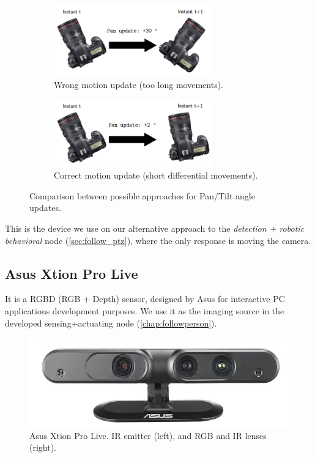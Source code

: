 		\begin{figure}[h]
			\centering
			\begin{subfigure}[h]{0.4\linewidth}
				\centering
				\includegraphics[width=2.7in]{images/ptz_wrong_movement}
				\caption{Wrong motion update (too long movements).}
				\label{fig:3_ptz_wrong}
			\end{subfigure}
			\qquad
			\begin{subfigure}[h]{0.4\linewidth}
				\centering
				\includegraphics[width=2.7in]{images/ptz_correct_movement}
				\caption{Correct motion update (short differential movements).}
				\label{fig:3_ptz_right}
			\end{subfigure}
			\caption{Comparison between possible approaches for Pan/Tilt angle updates.}
			\label{fig:3_ptz_movements}
		\end{figure}
		

		This is the device we use on our alternative approach to the \emph{detection + robotic behavioral} node (\autoref{sec:follow_ptz}), where the only response is moving the camera.\\

	\subsection{Asus Xtion Pro Live}
		\label{sec:3_xtion}
		It is a RGBD (RGB + Depth) sensor, designed by Asus for interactive PC applications development purposes. We use it as the imaging source in the developed sensing+actuating node (\autoref{chap:followperson}).\\

		\begin{figure}[h]
			\centering
			\includegraphics[width=0.4\linewidth]{images/xtion}
			\caption{Asus Xtion Pro Live. IR emitter (left), and RGB and IR lenses (right).}
			\label{fig:3_xtion}
		\end{figure}

